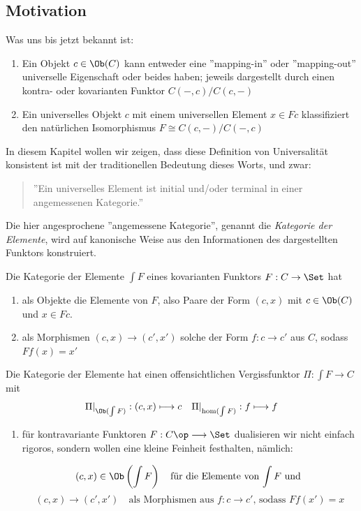 \documentclass[11pt]{article}
\begin{document}
\subsection{Motivation}
Was uns bis jetzt bekannt ist:
\begin{note}\mbox{}
\begin{enumerate}[label = -]
    \item Ein Objekt $c\in \Ob(C)$ kann entweder eine ''mapping-in'' oder ''mapping-out'' universelle Eigenschaft oder beides haben; jeweils dargestellt durch einen kontra- oder kovarianten Funktor $C(-,c) / C(c,-)$
    \item Ein universelles Objekt $c$ mit einem universellen Element $x\in Fc$ klassifiziert den natürlichen Isomorphismus $F\cong C(c,-)/C(-,c)$
\end{enumerate}
\end{note}
In diesem Kapitel wollen wir zeigen, dass diese Definition von Universalität konsistent ist mit der traditionellen Bedeutung dieses Worts, und zwar:
\begin{quote}
    ''Ein universelles Element ist initial und/oder terminal in einer angemessenen Kategorie.''
\end{quote}
Die hier angesprochene ''angemessene Kategorie'', genannt die \emph{Kategorie der Elemente}, wird auf kanonische Weise aus den Informationen des dargestellten Funktors konstruiert.

\begin{definition}  Die Kategorie der Elemente $\int F$ eines kovarianten Funktors $F:C\to \Set$ hat
\begin{enumerate}[label = \roman*)]
    \item als Objekte die Elemente von $F$, also Paare der Form $(c,x)$ mit $c\in \Ob(C)$ und $x\in Fc$.
    \item als Morphismen $(c,x)\to (c',x')$ solche der Form $f:c\to c'$ aus $C$, sodass $Ff(x) = x'$
\end{enumerate}
Die Kategorie der Elemente hat einen offensichtlichen Vergissfunktor $\Pi: \int F \to C$ mit
$$\Pi |_{\Ob(\int F)} : (c,x) \longmapsto c \quad \Pi |_{\hom(\int F)} : f \longmapsto f$$
    
\end{definition}

\begin{note}\mbox{}
    \begin{enumerate}[label = -]
        \item für kontravariante Funktoren $F: C\op\longrightarrow \Set$ dualisieren wir nicht einfach rigoros, sondern wollen eine kleine Feinheit festhalten, nämlich:

        $$(c,x) \in \Ob\left(\int F\right)\quad  \text{für die Elemente von $\int F$ und }$$
        $$(c,x) \to (c',x') \quad \text{als Morphismen aus $f:c\to c'$, sodass $Ff(x') = x$}$$
    \end{enumerate}
\end{note}
\end{document}
